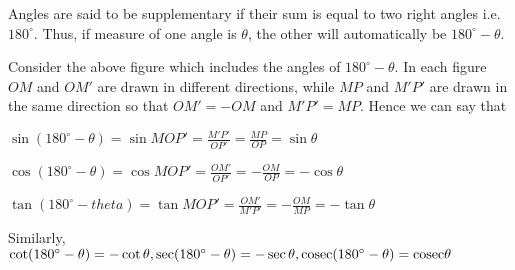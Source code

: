 Angles are said to be supplementary if their sum is equal to two right angles i.e. $180^\circ$. Thus, if measure of one angle is
$\theta$, the other will automatically be $180^\circ - \theta$.

Consider the above figure which includes the angles of $180^\circ - \theta$. In each figure $OM$ and $OM'$ are drawn in different
directions, while $MP$ and $M'P'$ are drawn in the same direction so that $OM'=-OM$ and $M'P' = MP$. Hence we can say that

$\sin(180^\circ - \theta) = \sin MOP' = \frac{M'P'}{OP'} = \frac{MP}{OP} = \sin\theta$

$\cos(180^\circ - \theta) = \cos MOP' = \frac{OM'}{OP'} = -\frac{OM}{OP} = -\cos\theta$

$\tan(180^\circ - theta) = \tan MOP' = \frac{OM'}{M'P'} = -\frac{OM}{MP} = -\tan\theta$

Similarly, $\cot(180^\circ - \theta) = -\cot\theta, \sec(180^\circ - \theta) = -\sec\theta, {\rm cosec}(180^\circ - \theta) = {\rm
cosec}\theta$

